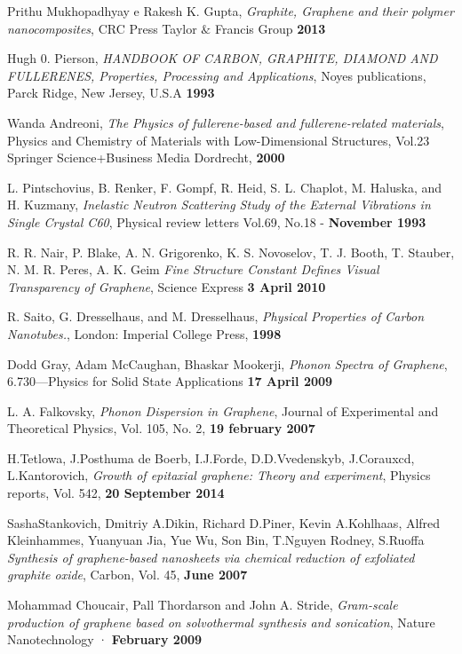 \documentclass[a4paper,titlepage]{book}
\begin{document}
\begin{thebibliography}{99}
Prithu Mukhopadhyay e Rakesh K. Gupta, \textit{Graphite, Graphene and their polymer nanocomposites}, CRC Press Taylor $\&$ Francis Group  \textbf {2013}

Hugh 0. Pierson, \textit{HANDBOOK OF CARBON, GRAPHITE, DIAMOND AND FULLERENES, Properties, Processing and Applications}, Noyes publications, Parck Ridge, New Jersey, U.S.A  \textbf {1993}

Wanda Andreoni, \textit{The Physics of fullerene-based and fullerene-related materials}, Physics and Chemistry of Materials with Low-Dimensional Structures, Vol.23  Springer Science+Business Media Dordrecht,  \textbf {2000}

L. Pintschovius, B. Renker, F. Gompf, R. Heid, S. L. Chaplot, M. Haluska, and H. Kuzmany, \textit{Inelastic Neutron Scattering Study of the External Vibrations in Single Crystal C60}, Physical review letters Vol.69, No.18 -  \textbf {November 1993}

R. R. Nair, P. Blake, A. N. Grigorenko, K. S. Novoselov, T. J. Booth, T. Stauber, N. M. R. Peres, A. K. Geim \textit{Fine Structure Constant Defines Visual Transparency of Graphene},  Science Express   \textbf {3 April 2010}

R. Saito, G. Dresselhaus, and M. Dresselhaus, \textit{Physical Properties of Carbon Nanotubes.},  London: Imperial College Press, \textbf {1998}
 
Dodd Gray, Adam McCaughan, Bhaskar Mookerji, \textit{Phonon Spectra of Graphene},  6.730—Physics for Solid State Applications \textbf {17 April 2009}

L. A. Falkovsky, \textit{Phonon Dispersion in Graphene},  Journal of Experimental and Theoretical Physics, Vol. 105, No. 2, \textbf {19 february 2007}

H.Tetlowa, J.Posthuma de Boerb, I.J.Forde, D.D.Vvedenskyb, J.Corauxcd, L.Kantorovich, \textit{Growth of epitaxial graphene: Theory and experiment},  Physics reports, Vol. 542,
 \textbf {20 September 2014}
 
SashaStankovich, Dmitriy A.Dikin, Richard D.Piner, Kevin A.Kohlhaas, Alfred Kleinhammes, Yuanyuan Jia, Yue Wu, Son Bin, T.Nguyen Rodney, S.Ruoffa \textit{Synthesis of graphene-based nanosheets via chemical reduction of exfoliated graphite oxide}, Carbon, Vol. 45, \textbf {June 2007}

Mohammad Choucair, Pall Thordarson and John A. Stride, \textit{Gram-scale production of graphene based on solvothermal synthesis and sonication}, Nature Nanotechnology ·  \textbf {February 2009}


\end{thebibliography}
\end{document}
